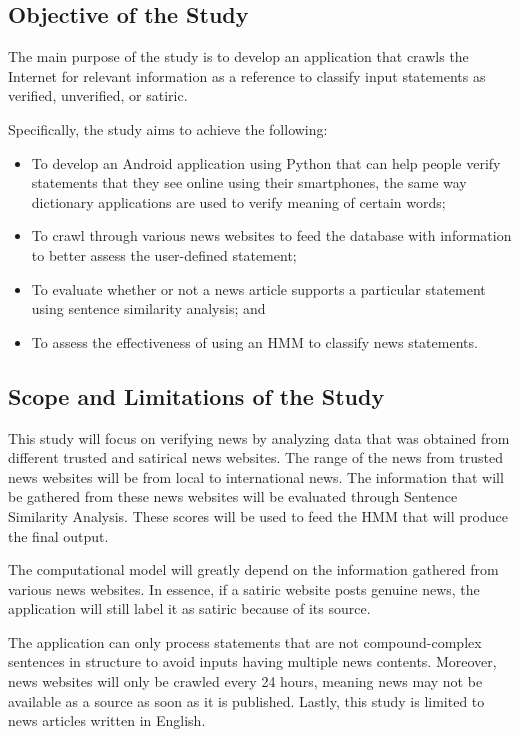 \documentclass[journal]{./IEEEtran}
\begin{document}
	\subsection{Objective of the Study}
	The main purpose of the study is to develop an application
	that crawls the Internet for relevant information as a reference to classify input statements as verified, unverified, or satiric.
	
	Specifically, the study aims to achieve the following:
	
	\begin{itemize}
		\item To develop an Android application using Python that can help people verify statements that they see online using their smartphones, the same way dictionary applications are used to verify meaning of certain words;
		\item To crawl through various news websites to feed the database with information to better assess the user-defined statement;
		\item To evaluate whether or not a news article supports a particular statement using sentence similarity analysis; and
		\item To assess the effectiveness of using an HMM to classify news statements.
	\end{itemize}
	
	\subsection{Scope and Limitations of the Study}
    This study will focus on verifying news by analyzing data that was obtained from different trusted and satirical news websites. The range of the news from trusted news websites will be from local to international news. The information that will be gathered from these news websites will be evaluated through Sentence Similarity Analysis. These scores will be used to feed the HMM that will produce the final output.
    
    The computational model will greatly depend on the information gathered from various news websites. In essence, if a satiric website posts genuine news, the application will still label it as satiric because of its source.
    
    The application can only process statements that are not compound-complex sentences in structure to avoid inputs having multiple news contents. Moreover, news websites will only be crawled every 24 hours, meaning news may not be available as a source as soon as it is published. Lastly, this study is limited to news articles written in English.
	
\end{document}
